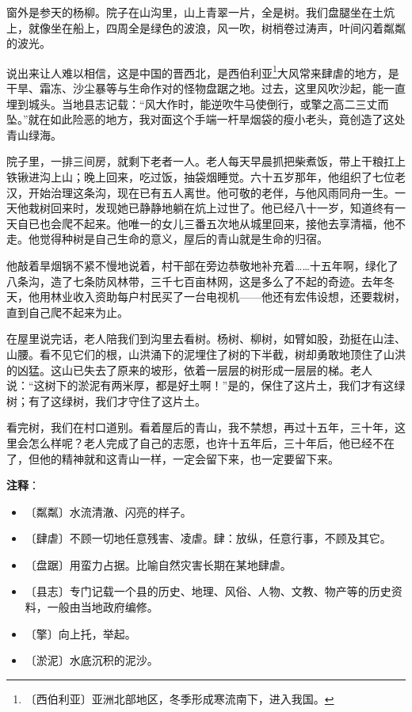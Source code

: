 \documentclass[12pt,UTF-8,openany]{ctexbook}
\begin{document}
\begin{Large}
    
    窗外是参天的杨柳。院子在山沟里，山上青翠一片，全是树。我们盘腿坐在土炕上，就像坐在船上，四周全是绿色的波浪，风一吹，树梢卷过涛声，叶间闪着粼粼的波光。
    
    说出来让人难以相信，这是中国的晋西北，是西伯利亚\footnote{〔西伯利亚〕亚洲北部地区，冬季形成寒流南下，进入我国。}大风常来肆虐的地方，是干旱、霜冻、沙尘暴等与生命作对的怪物盘踞之地。过去，这里风吹沙起，能一直埋到城头。当地县志记载：“风大作时，能逆吹牛马使倒行，或擎之高二三丈而坠。”就在如此险恶的地方，我对面这个手端一杆旱烟袋的瘦小老头，竟创造了这处青山绿海。
    
    院子里，一排三间房，就剩下老者一人。老人每天早晨抓把柴煮饭，带上干粮扛上铁锹进沟上山；晚上回来，吃过饭，抽袋烟睡觉。六十五岁那年，他组织了七位老汉，开始治理这条沟，现在已有五人离世。他可敬的老伴，与他风雨同舟一生。一天他栽树回来时，发现她已静静地躺在炕上过世了。他已经八十一岁，知道终有一天自已也会爬不起来。他唯一的女儿三番五次地从城里回来，接他去享清福，他不走。他觉得种树是自己生命的意义，屋后的青山就是生命的归宿。
    
    他敲着旱烟锅不紧不慢地说着，村干部在旁边恭敬地补充着……十五年啊，绿化了八条沟，造了七条防风林带，三千七百亩林网，这是多么了不起的奇迹。去年冬天，他用林业收入资助每户村民买了一台电视机——他还有宏伟设想，还要栽树，直到自己爬不起来为止。
    
    在屋里说完话，老人陪我们到沟里去看树。杨树、柳树，如臂如股，劲挺在山洼、山腰。看不见它们的根，山洪涌下的泥埋住了树的下半截，树却勇敢地顶住了山洪的凶猛。这山已失去了原来的坡形，依着一层层的树形成一层层的梯。老人说：“这树下的淤泥有两米厚，都是好土啊！”是的，保住了这片土，我们才有这绿树；有了这绿树，我们才守住了这片土。
    
    看完树，我们在村口道别。看着屋后的青山，我不禁想，再过十五年，三十年，这里会怎么样呢？老人完成了自己的志愿，也许十五年后，三十年后，他已经不在了，但他的精神就和这青山一样，一定会留下来，也一定要留下来。
    
\end{Large}


\newpage

\textbf{注释}：

\vspace{-1em}

\begin{itemize}
    \setlength\itemsep{-0.2em}
    \item 〔粼粼〕水流清澈、闪亮的样子。
    \item 〔肆虐〕不顾一切地任意残害、凌虐。肆：放纵，任意行事，不顾及其它。
    \item 〔盘踞〕用蛮力占据。比喻自然灾害长期在某地肆虐。
    \item 〔县志〕专门记载一个县的历史、地理、风俗、人物、文教、物产等的历史资料，一般由当地政府编修。
    \item 〔擎〕向上托，举起。
    \item 〔淤泥〕水底沉积的泥沙。
\end{itemize}
\end{document}
